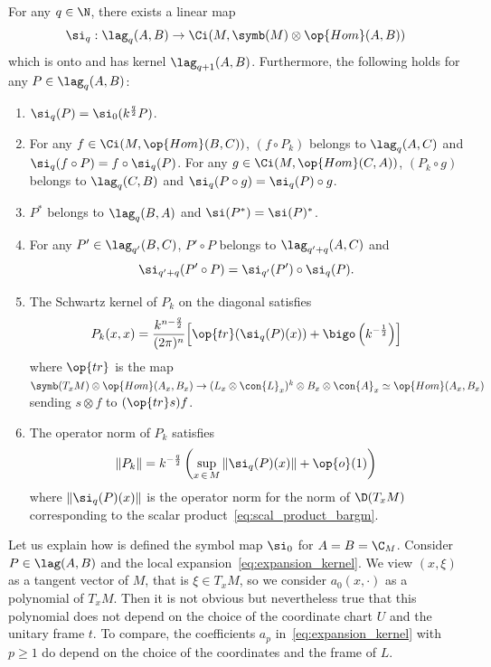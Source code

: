 \begin{theo}\label{theo:lag}
For any $q \in \N$, there exists a linear map
\[
\si_q: \lag_q (A,B) \rightarrow \Ci (M, \symb (M) \otimes \op{Hom}
(A,B))
\]
which is onto and has kernel $\lag_{q+1} (A,B)$. Furthermore, the
following holds for any $ P \in \lag_q (A,B)$:
\begin{enumerate}
\item\label{theo2.3.1} $\si _q (P) = \si_0 (k^{\frac{q}{2}} P)$.
\item\label{theo2.3.2} For any $f \in \Ci (M, \op{Hom} (B, C))$, $(f \circ P_k)$ belongs to $\lag_q (A,C)$ and $\si_q(f \circ P) = f \circ \si_q (P)$. For any $g \in \Ci (M, \op{Hom} (C, A))$, $(P_k
\circ g)$ belongs to $\lag_q (C,B)$ and $\si_q (P \circ g) = \si_q (P)
\circ g$.
\item\label{theo2.3.3} $P^* $ belongs to $\lag_q (B,A)$ and $\si (P^*) = \si (P)^*$.
\item\label{theo2.3.4} For any $P' \in \lag_{q'}(B,C)$, $P' \circ P$ belongs to $\lag_{q'+ q }(A,C)$ and
\[
\si_{q'+ q} (P' \circ P) = \si_{q'} (P') \circ \si_q (P).
\]
\item\label{theo2.3.5} The Schwartz kernel of $P_k$ on the diagonal satisfies
\[
P_k (x,x) = \frac{k^{n-\frac{q}{2}}}{ (2\pi)^n} \Bigl[\op{tr} (\si_q(P)(x))
+ \bigo \left(k^{-\frac{1}{2}}\right) \Bigr]
\]
where $\op{tr}$ is the map $\symb (T_xM) \otimes \op{Hom} (A_x,B_x) \rightarrow (L_x \otimes \con{L}_x)^k \otimes B_x \otimes
\con{A}_x \simeq \op{Hom} (A_x,B_x)$ sending $s \otimes f$ to $(\op{tr} s) f$.
\item\label{theo2.3.6}  The operator norm of $P_k$ satisfies
\[
\| P_k \| = k^{-\frac{q}{2}} \left(\sup_{x\,\in\,M} \left\|\si_q (P) (x) \right\| +
\op{o} (1) \right)
\]
where $\|\si_q (P) (x) \|$ is the operator norm for the norm of $\D (T_xM)$ corresponding to the scalar product~\eqref{eq:scal_product_bargm}. 
\end{enumerate}
\end{theo}



Let us explain how is defined the symbol map $\si_0$ for $A= B = \C_M$. Consider $P \in \lag (A,B)$ and the local expansion~\eqref{eq:expansion_kernel}. We view $(x,\xi)$ as a tangent vector of $M$, that is $
\xi \in T_xM$, so we consider $a_0 (x, \cdot)$ as a polynomial of $T_xM$. Then it is not obvious but nevertheless true that this polynomial does not depend on the choice of the coordinate chart $U$ and the unitary frame $t$. To compare, the coefficients $a_p$ in~\eqref{eq:expansion_kernel} with $p \geqslant 1$ do depend on the choice of the coordinates and the frame of $L$.

